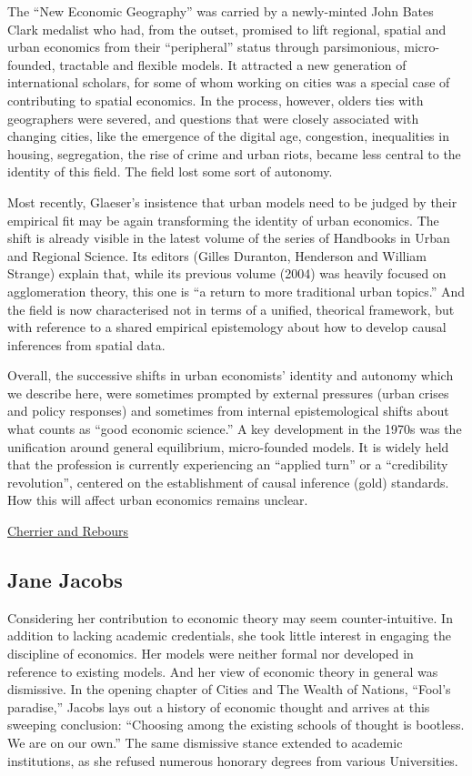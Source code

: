 \documentclass[
]{book}
\begin{document}
The ``New Economic Geography'' was carried by a newly-minted John Bates Clark medalist who had, from the outset, promised to lift regional, spatial and urban economics from their ``peripheral'' status through parsimonious, micro-founded, tractable and flexible models. It attracted a new generation of international scholars, for some of whom working on cities was a special case of contributing to spatial economics. In the process, however, olders ties with geographers were severed, and questions that were closely associated with changing cities, like the emergence of the digital age, congestion, inequalities in housing, segregation, the rise of crime and urban riots, became less central to the identity of this field. The field lost some sort of autonomy.

Most recently, Glaeser's insistence that urban models need to be judged by their empirical fit may be again transforming the identity of urban economics. The shift is already visible in the latest volume of the series of Handbooks in Urban and Regional Science. Its editors (Gilles Duranton, Henderson and William Strange) explain that, while its previous volume (2004) was heavily focused on agglomeration theory, this one is ``a return to more traditional urban topics.'' And the field is now characterised not in terms of a unified, theorical framework, but with reference to a shared empirical epistemology about how to develop causal inferences from spatial data.

Overall, the successive shifts in urban economists' identity and autonomy which we describe here, were sometimes prompted by external pressures (urban crises and policy responses) and sometimes from internal epistemological shifts about what counts as ``good economic science.'' A key development in the 1970s was the unification around general equilibrium, micro-founded models. It is widely held that the profession is currently experiencing an ``applied turn'' or a ``credibility revolution'', centered on the establishment of causal inference (gold) standards. How this will affect urban economics remains unclear.

\href{https://hscif.org/economists-in-the-city-cherrierrebours/}{Cherrier and Rebours}

\hypertarget{jane-jacobs}{%
\subsection{Jane Jacobs}\label{jane-jacobs}}

Considering her contribution to economic theory may seem counter-intuitive. In addition to lacking academic credentials, she took little interest in engaging the discipline of economics. Her models were neither formal nor developed in reference to existing models. And her view of economic theory in general was dismissive. In the opening chapter of Cities and The Wealth of Nations, ``Fool's paradise,'' Jacobs lays out a history of economic thought and arrives at this sweeping conclusion: ``Choosing among the existing schools of thought is bootless. We are on our own.'' The same dismissive stance extended to academic institutions, as she refused numerous honorary degrees from various Universities.
\end{document}
